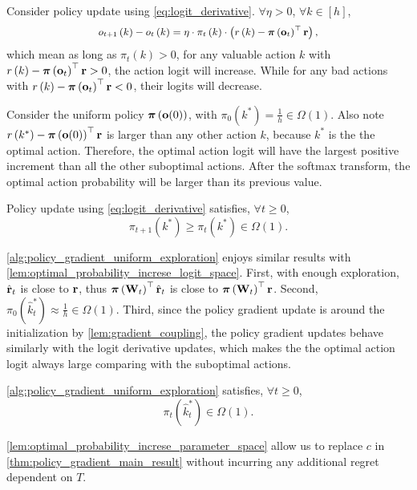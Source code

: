 Consider policy update using \cref{eq:logit_derivative}. $\forall \eta > 0$, $\forall k \in [h]$,
\begin{equation*}
\label{eq:logit_increment_logit_space}
\begin{split}
\small
    o_{t+1}\left(k\right) - o_{t}\left(k\right) = \eta \cdot \pi_{t}\left(k\right) \cdot \left( r\left(k\right) - \rvpi\left( \rvo_{t} \right)^\top \rvr \right),
\end{split}
\end{equation*}
which mean as long as $\pi_{t}\left(k\right) > 0$, for any valuable action $k$ with $r\left(k\right) -  {\boldsymbol{\pi}}\left( {\mathbf{o}}_{t} \right)^\top {\mathbf{r}} > 0$, the action logit will increase. While for any bad actions with $r\left(k\right) -  {\boldsymbol{\pi}}\left( {\mathbf{o}}_{t} \right)^\top {\mathbf{r}} < 0$, their logits will decrease.

Consider the uniform policy ${\boldsymbol{\pi}}\left( {\mathbf{o}}(0) \right)$, with $\pi_{0}\left(k^*\right) = \frac{1}{h} \in \Omega(1)$. Also note $r\left(k^*\right) - {\boldsymbol{\pi}}\left( {\mathbf{o}}(0) \right)^\top {\mathbf{r}}$ is larger than any other action $k$, because $k^*$ is the the optimal action. Therefore, the optimal action logit will have the largest positive increment than all the other suboptimal actions. After the softmax transform, the optimal action probability will be larger than its previous value. 
\begin{lem}
\label{lem:optimal_probability_increse_logit_space}
Policy update using \cref{eq:logit_derivative} satisfies, $\forall t \ge 0$,
\begin{equation*}
    \pi_{t+1}\left(k^*\right) \ge \pi_{t}\left(k^*\right) \in \Omega(1).
\end{equation*}
\end{lem}

\cref{alg:policy_gradient_uniform_exploration} enjoys similar results with \cref{lem:optimal_probability_increse_logit_space}. First, with enough exploration, $\hat{{\mathbf{r}}}_t$ is close to ${\mathbf{r}}$, thus ${\boldsymbol{\pi}}\left({\mathbf{W}}_t\right)^\top \hat{{\mathbf{r}}}_t$ is close to ${\boldsymbol{\pi}}\left({\mathbf{W}}_t\right)^\top {\mathbf{r}}$. Second, $\pi_0\left(\hat{k}_t^*\right) \approx \frac{1}{h} \in \Omega(1)$. Third, since the policy gradient update is around the initialization by \cref{lem:gradient_coupling}, the policy gradient updates behave similarly with the logit derivative updates, which makes the the optimal action logit always large comparing with the suboptimal actions.
\begin{lem}
\label{lem:optimal_probability_increse_parameter_space}
\cref{alg:policy_gradient_uniform_exploration} satisfies, $\forall t \ge 0$,
\begin{equation*}
    \pi_t\left(\hat{k}_t^*\right) \in \Omega(1).
\end{equation*}
\end{lem}
\cref{lem:optimal_probability_increse_parameter_space} allow us to replace $c$ in \cref{thm:policy_gradient_main_result} without incurring any additional regret dependent on $T$.

